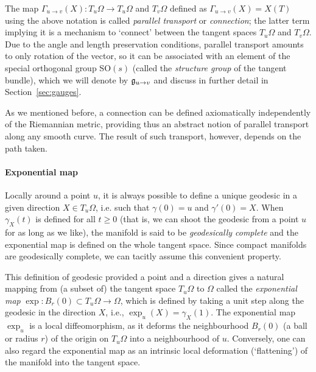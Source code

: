 The map $\Gamma_{u\rightarrow v}(X) : T_u\Omega \rightarrow T_u\Omega$ and $T_v\Omega$ defined as $\Gamma_{u\rightarrow v}(X) = X(T)$ using the above notation is called {\em parallel transport} or {\em connection}; the latter term implying it is a mechanism to `connect' between the tangent spaces $T_u\Omega$ and $T_v\Omega$. 
%
Due to the angle and length preservation conditions, parallel transport amounts to only rotation of the vector, so it can be associated with an element of the special orthogonal group $\mathrm{SO}(s)$ (called the {\em structure group} of the tangent bundle), which we will denote by ${\mathfrak{g}}_{u\rightarrow v}$ and 
discuss in further detail in Section~\ref{sec:gauges}. 

As we mentioned before,  a connection can be defined axiomatically independently of the Riemannian metric, providing thus an abstract notion of parallel transport along any smooth curve. The result of such transport, however, depends on the path taken.  





\paragraph{Exponential map}
Locally around a point $u$, it is always possible to define a unique geodesic in a given direction $X \in T_u\Omega$, i.e. such that %
$\gamma(0) = u$ and $\gamma'(0) = X$. %
%
%
When $\gamma_X(t)$ is defined for all $t\geq 0$ (that is, we can shoot the geodesic from a point $u$ for as long as we like), the manifold is said to be {\em geodesically complete} and the exponential map is defined on the whole tangent space.
%
Since compact manifolds are geodesically complete, we can tacitly assume this convenient property. 



%
This definition of geodesic provided a point and a direction gives a natural mapping from (a subset of) the tangent space $T_u \Omega$ to $\Omega$ called the {\em exponential map}  $\exp : B_r(0) \subset T_u\Omega \rightarrow \Omega$, which is defined by taking a unit step along the geodesic in the direction $X$, i.e., $\exp_u(X) = \gamma_X(1)$. %
%
The exponential map $\exp_u$ is a local diffeomorphism, as it deforms the neighbourhood $B_r(0)$ (a ball or radius $r$) of the origin on $T_u\Omega$ into a neighbourhood of $u$. Conversely, one can also regard the exponential map as an intrinsic local deformation (`flattening') of the manifold into the tangent space. 




